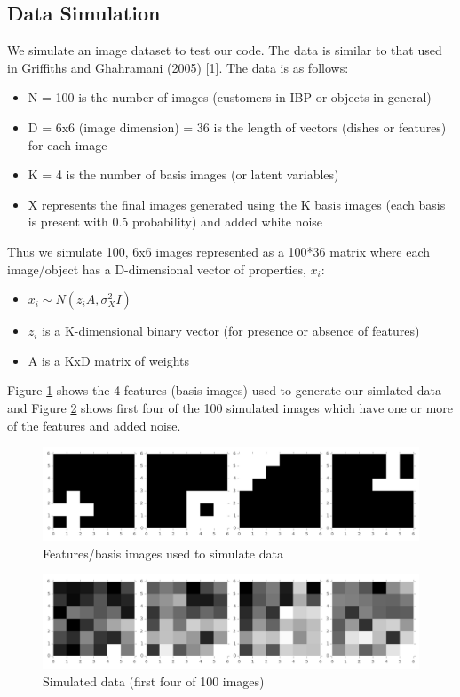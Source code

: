 \documentclass[11pt]{article}
\begin{document}
\subsection{Data Simulation}
We simulate an image dataset to test our code. The data is similar to that used in Griffiths and Ghahramani (2005) [1]. The data is as follows:
\begin{itemize}
  \item N = 100 is the number of images (customers in IBP or objects in general)
  \item D = 6x6 (image dimension) = 36 is the length of vectors (dishes or features) for each image
  \item K = 4 is the number of basis images (or latent variables)
  \item X represents the final images generated using the K basis images (each basis is present with 0.5 probability) and added white noise
\end{itemize}

Thus we simulate 100, 6x6 images represented as a 100*36 matrix where each image/object has a D-dimensional vector of properties, $x_{i}$:

\begin{itemize}
  \item $x_{i} \sim N(z_{i}A,\sigma_X^2I)$
  \item $z_{i}$ is a K-dimensional binary vector (for presence or absence of features)
  \item A is a KxD matrix of weights
\end{itemize}

Figure \ref{fig:feat} shows the 4 features (basis images) used to generate our simlated data and Figure \ref{fig:dataaa} shows first four of the 100 simulated images which have one or more of the features and added noise. 

\begin{figure}
\includegraphics[width=\linewidth]{data_files/features.png}
\caption {Features/basis images used to simulate data}
\label{fig:feat}
\end{figure}

\begin{figure}
\includegraphics[width=\linewidth]{data_files/data.png}
\caption {Simulated data (first four of 100 images)}
\label{fig:dataaa}
\end{figure}
\end{document}
